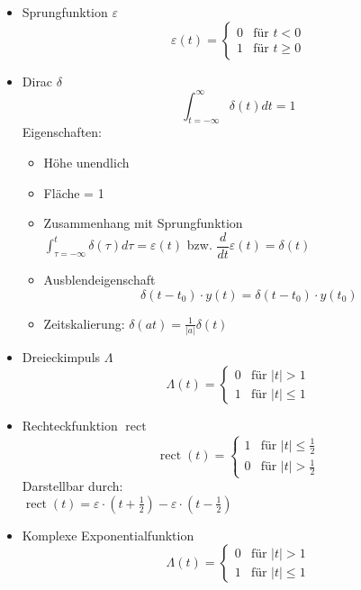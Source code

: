   \begin{mdframed}[style=exercise]
      \begin{itemize}
          \item{Sprungfunktion $\varepsilon$}
          \[ \varepsilon(t) =
             \begin{cases}
                 0 & \text{f\"ur } t < 0\\
                 1 & \text{f\"ur } t \geq 0
             \end{cases}
          \]
          \item{Dirac $\delta$}
          \[
              \int_{t=-\infty}^{\infty} \delta(t)dt = 1
          \]
          Eigenschaften:
          \begin{itemize}
              \item{H\"ohe unendlich}
              \item{Fl\"ache = 1}
              \item{Zusammenhang mit Sprungfunktion}\\
                  $\int_{\tau=-\infty}^{t}\delta(\tau)d\tau =
                  \varepsilon(t)$ bzw.  $\dfrac{d}{dt}\varepsilon(t) =
                  \delta(t)$
              \item{Ausblendeigenschaft}
                  \[
                      \delta(t-t_0)\cdot y(t) = \delta(t-t_0)\cdot y(t_0)
                  \]
              \item{Zeitskalierung: }
                  $\delta(at)=\frac{1}{\lvert a\rvert}\delta(t)$
          \end{itemize}
          \item{Dreieckimpuls $\Lambda$}
          \[ \Lambda(t) =
             \begin{cases}
                 0 & \text{f\"ur } \vert t\rvert > 1\\
                 1 & \text{f\"ur } \vert t\rvert \leq 1
             \end{cases}
          \]
          \item{Rechteckfunktion $\operatorname{rect}$}
          \[ \operatorname{rect}(t) =
             \begin{cases}
                 1 & \text{f\"ur } \vert t\rvert \leq \frac{1}{2}\\
                 0 & \text{f\"ur } \vert t\rvert > \frac{1}{2}
             \end{cases}
          \]
          Darstellbar durch:\\ $\operatorname{rect}(t) = \varepsilon\cdot\left( t+\frac{1}{2} \right)-\varepsilon\cdot\left( t-\frac{1}{2} \right)$
          \item{Komplexe Exponentialfunktion}
          \[ \Lambda(t) =
             \begin{cases}
                 0 & \text{f\"ur } \vert t\rvert > 1\\
                 1 & \text{f\"ur } \vert t\rvert \leq 1
             \end{cases}
          \]
      \end{itemize}
  \end{mdframed}
